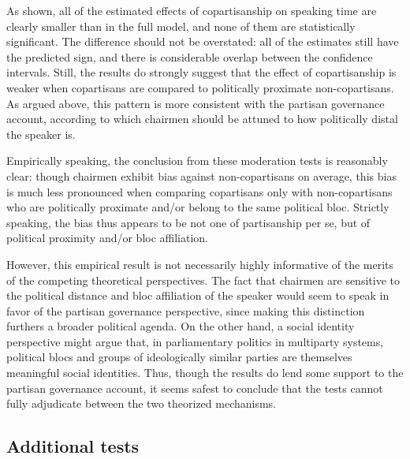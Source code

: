 \documentclass[12pt,a4paper]{article}
\begin{document}
As shown, all of the estimated effects of copartisanship on speaking time are clearly smaller than in the full model, and none of them are statistically significant. The difference should not be overstated: all of the estimates still have the predicted sign, and there is considerable overlap between the confidence intervals. Still, the results do strongly suggest that the effect of copartisanship is weaker when copartisans are compared to politically proximate non-copartisans. As argued above, this pattern is more consistent with the partisan governance account, according to which chairmen should be attuned to how politically distal the speaker is.

Empirically speaking, the conclusion from these moderation tests is reasonably clear: though chairmen exhibit bias against non-copartisans on average, this bias is much less pronounced when comparing copartisans only with non-copartisans who are politically proximate and/or belong to the same political bloc. Strictly speaking, the bias thus appears to be not one of partisanship per se, but of political proximity and/or bloc affiliation.

However, this empirical result is not necessarily highly informative of the merits of the competing theoretical perspectives. The fact that chairmen are sensitive to the political distance and bloc affiliation of the speaker would seem to speak in favor of the partisan governance perspective, since making this distinction furthers a broader political agenda. On the other hand, a social identity perspective might argue that, in parliamentary politics in multiparty systems, political blocs and groups of ideologically similar parties are themselves meaningful social identities. Thus, though the results do lend some support to the partisan governance account, it seems safest to conclude that the tests cannot fully adjudicate between the two theorized mechanisms.

\subsection{Additional tests}
\end{document}
